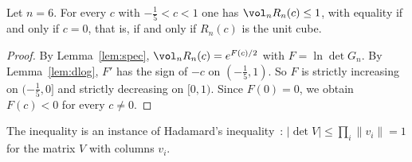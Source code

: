 \begin{theorem}\label{thm:main}
Let $n=6$. For every $c$ with $- \frac{1}{5}<c<1$ one has $\vol_nR_n(c)\le1$, with equality if and only if $c=0$, that is, if and only if $R_n(c)$ is the unit cube.
\end{theorem}
\begin{proof}
By Lemma~\ref{lem:spec}, $\vol_nR_n(c)=e^{F(c)/2}$ with $F=\ln\det G_n$.
By Lemma~\ref{lem:dlog}, $F'$ has the sign of $-c$ on $(- \frac{1}{5},1)$.
So $F$ is strictly increasing on $(- \frac{1}{5},0]$ and strictly decreasing on $[0,1)$.
Since $F(0)=0$, we obtain $F(c)<0$ for every $c\ne0$.
\end{proof}
\begin{remark}
The inequality is an instance of Hadamard's inequality~\cite{hadamard}: $|\det V|\le\prod_i\|v_i\|=1$ for the matrix $V$ with columns $v_i$.
\end{remark}
